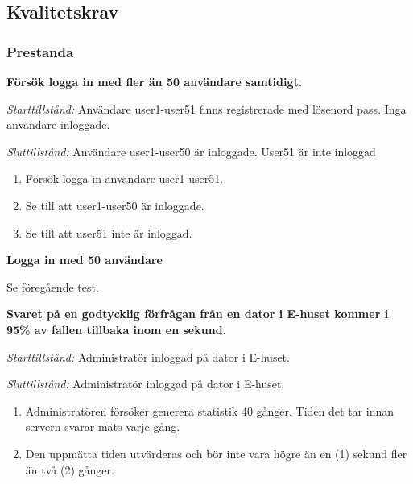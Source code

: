 \documentclass[a4paper]{article}
\begin{document}




\subsection{Kvalitetskrav}

\subsubsection{Prestanda}

\begin{ST}
\item
\textbf{Försök logga in med fler än 50 användare samtidigt.}

\emph{Starttillstånd:} Användare user1-user51 finns registrerade med lösenord pass. Inga användare inloggade.

\emph{Sluttillstånd:} Användare user1-user50 är inloggade. User51 är inte inloggad

\begin{enumerate}

\item
Försök logga in användare user1-user51.
\item
Se till att user1-user50 är inloggade.
\item
Se till att user51 inte är inloggad.
\end{enumerate}

\item
\textbf{Logga in med 50 användare}

Se föregående test.

\item
\textbf{Svaret på en godtycklig förfrågan från en dator i E-huset kommer i 95\% av fallen tillbaka
inom en sekund.}

\emph{Starttillstånd:} Administratör inloggad på dator i E-huset.

\emph{Sluttillstånd:} Administratör inloggad på dator i E-huset.

\begin{enumerate}

\item Administratören försöker generera statistik 40 gånger. Tiden det tar innan servern svarar mäts varje gång.

\item Den uppmätta tiden utvärderas och bör inte vara högre än en (1) sekund fler än två (2) gånger.


\end{enumerate}

\end{ST}
\end{document}
